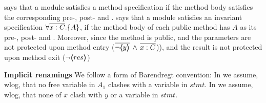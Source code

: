 %
% 
 {{} says that  a module satisfies a method specification if the method body satisfies the corresponding pre-, post- and \midcond.
 }
 {{} says that  a module satisfies an invariant specification $\forall { \overline{x:C}}.{{\{}}{A}{{\}}}$,  if the method body of each public method
 has $A$ as its  pre-, post- and \midcond. Moreover, since the method is public,  and the parameters are not protected upon method entry ($\overline{ \neg\langle\!\!\langle y \rangle\!\!\rangle}\, \wedge\, \overline{x:C}$)),
 and the result is not protected upon method exit ($ \neg\langle\!\!\langle res \rangle\!\!\rangle$)
}
 
 \vspace{.1cm}

\noindent
\textbf{Implicit renamings} We follow a form of Barendregt convention: In  {}  we assume, wlog, that no free variable  in $A_1$   clashes with a variable  in $stmt$.
In {} we assume, wlog, that none of
 $\overline x$ clash with  $\overline y$ or a variable  in $stmt$. 


 




 
